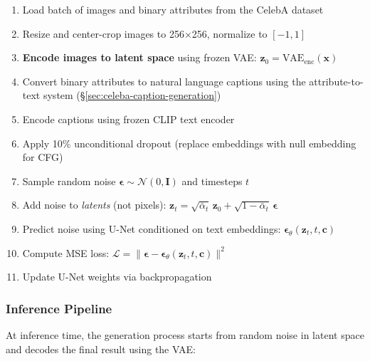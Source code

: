 \begin{enumerate}
    \item Load batch of images and binary attributes from the CelebA dataset
    \item Resize and center-crop images to 256$\times$256, normalize to $[-1, 1]$
    \item \textbf{Encode images to latent space} using frozen VAE: $\mathbf{z}_0 = \text{VAE}_{\text{enc}}(\mathbf{x})$
    \item Convert binary attributes to natural language captions using the attribute-to-text system (\S\ref{sec:celeba-caption-generation})
    \item Encode captions using frozen CLIP text encoder
    \item Apply 10\% unconditional dropout (replace embeddings with null embedding for CFG)
    \item Sample random noise $\boldsymbol{\epsilon} \sim \mathcal{N}(0, \mathbf{I})$ and timesteps $t$
    \item Add noise to \emph{latents} (not pixels): $\mathbf{z}_t = \sqrt{\bar{\alpha}_t}\,\mathbf{z}_0 + \sqrt{1-\bar{\alpha}_t}\,\boldsymbol{\epsilon}$
    \item Predict noise using U-Net conditioned on text embeddings: $\boldsymbol{\epsilon}_\theta(\mathbf{z}_t, t, \mathbf{c})$
    \item Compute MSE loss: $\mathcal{L} = \|\boldsymbol{\epsilon} - \boldsymbol{\epsilon}_\theta(\mathbf{z}_t, t, \mathbf{c})\|^2$
    \item Update U-Net weights via backpropagation
\end{enumerate}

\subsubsection{Inference Pipeline}

At inference time, the generation process starts from random noise in latent space and decodes the final result using the VAE:

